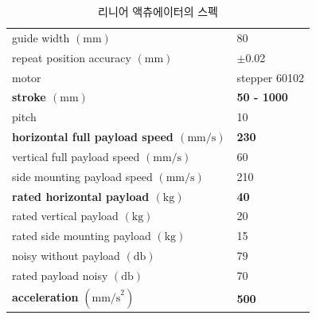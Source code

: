 \begin{table}[H]
    \centering
    \captionsetup{justification=centering}
    \caption{리니어 액츄에이터의 스펙}
    \begin{tabular}{l|l}
        \hline
        guide width $(\mathrm{mm})$                       & 80                                     \\
        repeat position accuracy $(\mathrm{mm})$          & $\pm$0.02                                 \\
        motor                                  & stepper 60102                          \\
        \textbf{stroke $(\mathrm{mm})$}                  & \textbf{50 - 1000}                                    \\
        pitch                                  & 10                                     \\
        \textbf{horizontal full payload speed $(\mathrm{mm/s})$}   & \textbf{230}                                    \\
        vertical full payload speed $(\mathrm{mm/s})$     & 60                                     \\
        side mounting payload speed $(\mathrm{mm/s})$     & 210                                    \\
        \textbf{rated horizontal payload $(\mathrm{kg})$}          & \textbf{40}                                     \\
        rated vertical payload $(\mathrm{kg})$            & 20                                     \\
        rated side mounting payload $(\mathrm{kg})$       & 15                                     \\
        noisy without payload $(\mathrm{db})$             & 79                                     \\
        rated payload noisy $(\mathrm{db})$               & 70                                     \\
        \textbf{acceleration } $(\mathrm{mm/s}^{2})$   & \textbf{500}                                    \\ \hline
    \end{tabular}%
    \label{Specification of Linear Actuator}
\end{table}

